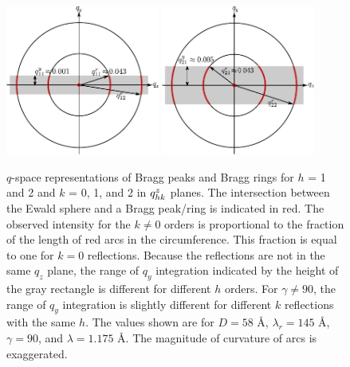 \begin{figure}[htbp]
  \centering
  \includegraphics[width=0.45\textwidth]{figures/ripple/analysis/ewald_side_h1_ver1}
  \includegraphics[width=0.45\textwidth]{figures/ripple/analysis/ewald_side_h2_ver1}
  \caption{$q$-space representations of Bragg peaks and Bragg rings 
  for $h$ = 1 and 2 and $k$ = 0, 1, and 2 in $q_{hk}^z$ planes.
  The intersection between the Ewald sphere and 
  a Bragg peak/ring is indicated in red. 
  The observed intensity for the $k\neq 0$ orders is proportional to
  the fraction of the length of red arcs in the circumference. This 
  fraction is equal to one for $k=0$ reflections.
  Because the reflections are not in the same $q_z$ plane, the range of $q_y$ 
  integration indicated by the height of the gray rectangle is different for different
  $h$ orders. For $\gamma\neq 90$\textdegree, the range of $q_y$ integration is
  slightly different for different $k$ reflections with the same $h$. 
  The values shown are for $D=58$ \AA, $\lambda_r=145$ \AA, $\gamma=90$\textdegree,
  and $\lambda=1.175$ \AA. The magnitude of curvature of arcs is exaggerated.}
  \label{fig:ewald_side}
\end{figure}

